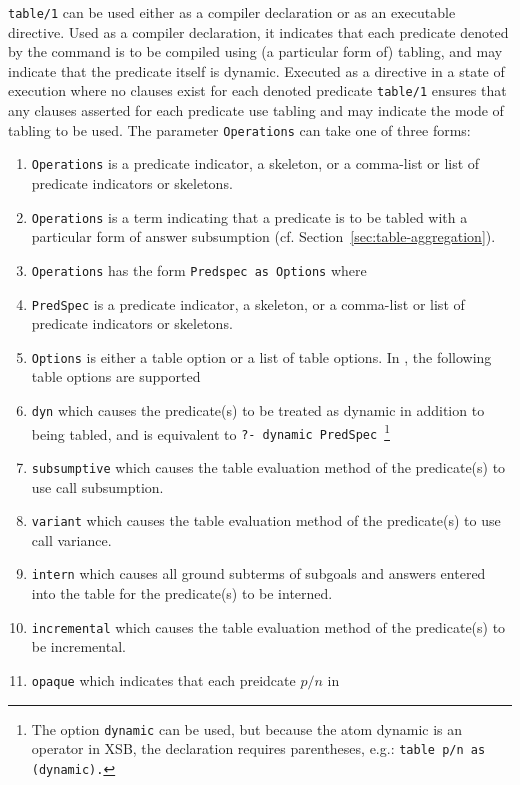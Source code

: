 \begin{description}
\label{table-declaration}
%
{\tt table/1} can be used either as a compiler declaration or as an
executable directive.  Used as a compiler declaration, it indicates
that each predicate denoted by the command is to be compiled using (a
particular form of) tabling, and may indicate that the predicate
itself is dynamic.
Executed as a directive in a state of execution where no clauses exist
for each denoted predicate {\tt table/1} ensures that any clauses
asserted for each predicate use tabling and may indicate the mode of
tabling to be used.  The parameter {\tt Operations} can take one of
three forms:
%
\begin{enumerate}
\item {\tt Operations} is a predicate indicator, a skeleton, or
  a comma-list or list of predicate indicators or skeletons.
%
\item {\tt Operations} is a term indicating that a predicate is to be
  tabled with a particular form of answer subsumption
  (cf. Section~\ref{sec:table-aggregation}).
%
\item {\tt Operations} has the form {\tt Predspec as Options} where
\bi
\item {\tt PredSpec} is a predicate indicator, a skeleton, or a
  comma-list or list of predicate indicators or skeletons.
%
\item {\tt Options} is either a table option or a list of table
  options.  In \version, the following table options are supported
\bi
\item {\tt dyn} which causes the predicate(s) to be treated as dynamic
  in addition to being tabled, and is equivalent to {\tt ?- dynamic
    PredSpec}~\footnote{The option {\tt dynamic} can be used, but
    because the atom dynamic is an operator in XSB, the declaration
    requires parentheses, e.g.: {\tt table p/n as (dynamic).}}
%
\item {\tt subsumptive} which causes the table evaluation method of
  the predicate(s) to use call subsumption.
%
\item {\tt variant} which causes the table evaluation method of the
  predicate(s) to use call variance.
%
\item {\tt intern} which causes all ground subterms of subgoals and 
answers entered into the table for the predicate(s) to be interned.
%
\item {\tt incremental} which causes the table evaluation method of
  the predicate(s) to be incremental.
%
\item {\tt opaque} which indicates that each preidcate $p/n$ in {\tt
}
\end{enumerate}
\end{description}

